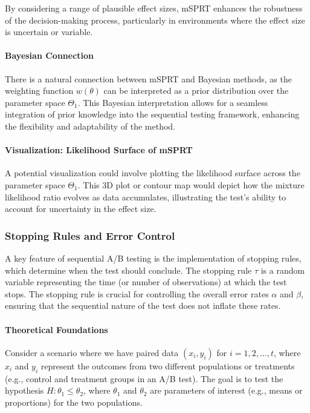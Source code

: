 \documentclass[magisterska, english]{pwr_wmat_praca_dyplomowa}
\theoremstyle{plain}
\numberwithin{theorem}{chapter}
\theoremstyle{definition}
\numberwithin{theorem}{chapter}
\begin{document}
By considering a range of plausible effect sizes, mSPRT enhances the robustness of the decision-making process, particularly in environments where the effect size is uncertain or variable.

\paragraph{Bayesian Connection}

There is a natural connection between mSPRT and Bayesian methods, as the weighting function \( w(\theta) \) can be interpreted as a prior distribution over the parameter space \( \Theta_1 \). This Bayesian interpretation allows for a seamless integration of prior knowledge into the sequential testing framework, enhancing the flexibility and adaptability of the method.

\paragraph{Visualization: Likelihood Surface of mSPRT}
A potential visualization could involve plotting the likelihood surface across the parameter space \( \Theta_1 \). This 3D plot or contour map would depict how the mixture likelihood ratio evolves as data accumulates, illustrating the test's ability to account for uncertainty in the effect size.

\subsubsection{Stopping Rules and Error Control}

A key feature of sequential A/B testing is the implementation of stopping rules, which determine when the test should conclude. The stopping rule \( \tau \) is a random variable representing the time (or number of observations) at which the test stops. The stopping rule is crucial for controlling the overall error rates \( \alpha \) and \( \beta \), ensuring that the sequential nature of the test does not inflate these rates.
\paragraph{Theoretical Foundations}

Consider a scenario where we have paired data \((x_i, y_i)\) for \(i = 1, 2, \dots, t\), where \(x_i\) and \(y_i\) represent the outcomes from two different populations or treatments (e.g., control and treatment groups in an A/B test). The goal is to test the hypothesis \(H: \theta_1 \leq \theta_2\), where \(\theta_1\) and \(\theta_2\) are parameters of interest (e.g., means or proportions) for the two populations.
\end{document}
